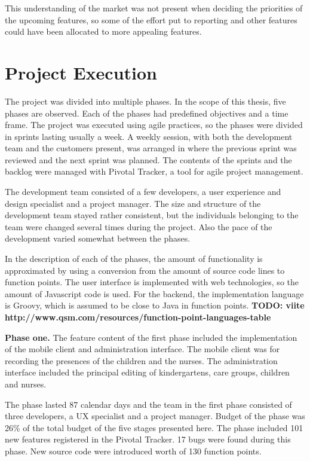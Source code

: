 This understanding of the market was not present when deciding the priorities of the upcoming features, so some of the effort put to reporting and other features could have been allocated to more appealing features.

 \section{Project Execution}

The project was divided into multiple phases. In the scope of this thesis, five phases are observed. Each of the phases had predefined objectives and a time frame. The project was executed using agile practices, so the phases were divided in sprints lasting usually a week. A weekly session, with both the development team and the customers present, was arranged in where the previous sprint was reviewed and the next sprint was planned. The contents of the sprints and the backlog were managed with Pivotal Tracker, a tool for agile project management.

The development team consisted of a few developers, a user experience and design specialist and a project manager. The size and structure of the development team stayed rather consistent, but the individuals belonging to the team were changed several times during the project. Also the pace of the development varied somewhat between the phases.

In the description of each of the phases, the amount of functionality is approximated by using a conversion from the amount of source code lines to function points. The user interface is implemented with web technologies, so the amount of Javascript code is used. For the backend, the implementation language is Groovy, which is assumed to be close to Java in function points. \textbf{TODO: viite http://www.qsm.com/resources/function-point-languages-table}

\textbf{Phase one.} The feature content of the first phase included the implementation of the mobile client and administration interface. The mobile client was for recording the presences of the children and the nurses. The administration interface included the principal editing of kindergartens, care groups, children and nurses.

The phase lasted 87 calendar days and the team in the first phase consisted of three developers, a UX specialist and a project manager. Budget of the phase was 26\% of the total budget of the five stages presented here. The phase included 101 new features registered in the Pivotal Tracker. 17 bugs were found during this phase. New source code were introduced worth of 130 function points.

